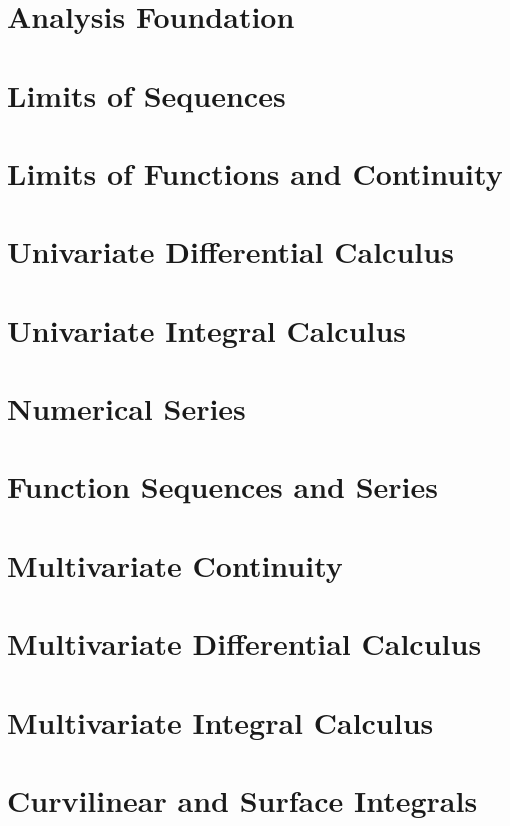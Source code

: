 \documentclass{report}
\begin{document}
	
	\thispagestyle{empty}
	\newpage%
	\tableofcontents
  

  \chapter{Analysis Foundation}
  
  \chapter{Limits of Sequences}
  
  \chapter{Limits of Functions and Continuity}
  
  \chapter{Univariate Differential Calculus}
  
  \chapter{Univariate Integral Calculus}
  
  \chapter{Numerical Series}
  
  \chapter{Function Sequences and Series}
  
  \chapter{Multivariate Continuity}
  
  \chapter{Multivariate Differential Calculus}
  
  \chapter{Multivariate Integral Calculus}
  
  \chapter{Curvilinear and Surface Integrals}
  



  
\end{document}
